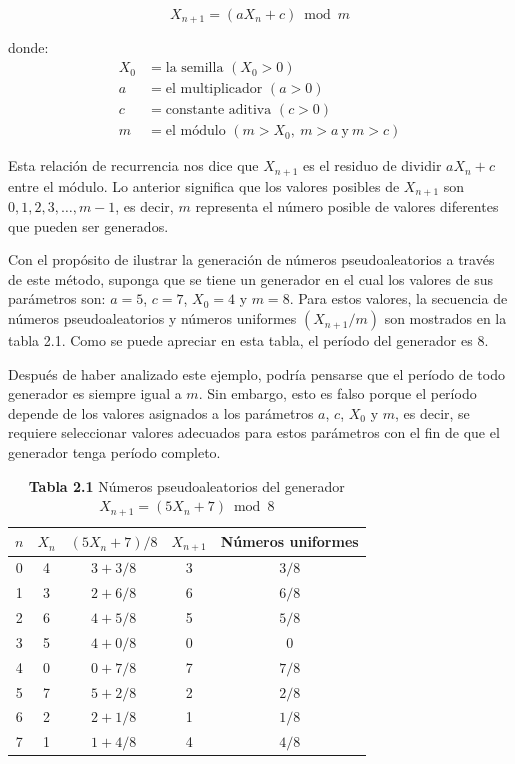 \documentclass[11pt,letterpaper]{report}
\begin{document}
\begin{equation}
X_{n+1} = (aX_n + c) \bmod m
\end{equation}

donde:
\begin{align*}
X_0 &= \text{la semilla } (X_0 > 0) \\
a &= \text{el multiplicador } (a > 0) \\
c &= \text{constante aditiva } (c > 0) \\
m &= \text{el módulo } (m > X_0,\ m > a\ \text{y}\ m > c)
\end{align*}

Esta relación de recurrencia nos dice que $X_{n+1}$ es el residuo de
dividir $aX_n + c$ entre el módulo. Lo anterior significa que los
valores posibles de $X_{n+1}$ son $0, 1, 2, 3, \ldots, m-1$, es decir,
$m$ representa el número posible de valores diferentes que pueden ser
generados.

Con el propósito de ilustrar la generación de números pseudoaleatorios a
través de este método, suponga que se tiene un generador en el cual los
valores de sus parámetros son: $a=5$, $c=7$, $X_0=4$ y $m=8$. Para estos
valores, la secuencia de números pseudoaleatorios y números uniformes
$(X_{n+1}/m)$ son mostrados en la tabla 2.1. Como se puede apreciar en
esta tabla, el período del generador es 8.

Después de haber analizado este ejemplo, podría pensarse que el período
de todo generador es siempre igual a $m$. Sin embargo, esto es falso
porque el período depende de los valores asignados a los parámetros $a$,
$c$, $X_0$ y $m$, es decir, se requiere seleccionar valores adecuados
para estos parámetros con el fin de que el generador tenga período
completo.

\begin{table}[H]
\centering
\caption*{\textbf{Tabla 2.1} Números pseudoaleatorios del generador $X_{n+1} = (5X_n + 7) \bmod 8$}
\begin{tabular}{ccccc}
\toprule
$n$ & $X_n$ & $(5X_n+7)/8$ & $X_{n+1}$ & Números uniformes \\
\midrule
0 & 4 & $3 + 3/8$ & 3 & $3/8$ \\
1 & 3 & $2 + 6/8$ & 6 & $6/8$ \\
2 & 6 & $4 + 5/8$ & 5 & $5/8$ \\
3 & 5 & $4 + 0/8$ & 0 & $0$ \\
4 & 0 & $0 + 7/8$ & 7 & $7/8$ \\
5 & 7 & $5 + 2/8$ & 2 & $2/8$ \\
6 & 2 & $2 + 1/8$ & 1 & $1/8$ \\
7 & 1 & $1 + 4/8$ & 4 & $4/8$ \\
\bottomrule
\end{tabular}
\end{table}
\end{document}
